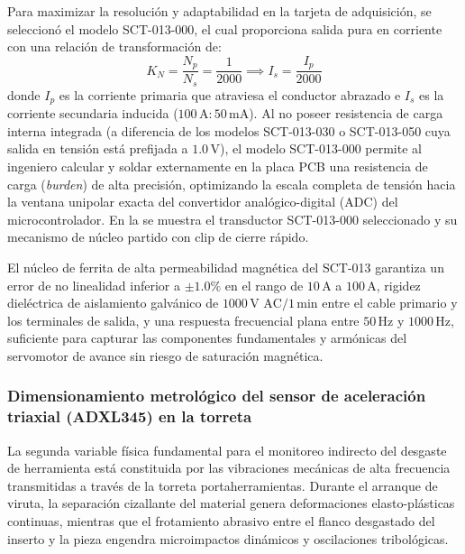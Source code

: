 Para maximizar la resolución y adaptabilidad en la tarjeta de adquisición, se seleccionó el modelo SCT-013-000, el cual proporciona salida pura en corriente con una relación de transformación de:
\begin{equation}
K_N = \frac{N_p}{N_s} = \frac{1}{2000} \implies I_s = \frac{I_p}{2000}
\label{eq:mp_relacion_transformacion}
\end{equation}
\noindent donde $I_p$ es la corriente primaria que atraviesa el conductor abrazado e $I_s$ es la corriente secundaria inducida ($100\,\text{A} : 50\,\text{mA}$). Al no poseer resistencia de carga interna integrada (a diferencia de los modelos SCT-013-030 o SCT-013-050 cuya salida en tensión está prefijada a $1.0\,\text{V}$), el modelo SCT-013-000 permite al ingeniero calcular y soldar externamente en la placa PCB una resistencia de carga (\textit{burden}) de alta precisión, optimizando la escala completa de tensión hacia la ventana unipolar exacta del convertidor analógico-digital (ADC) del microcontrolador. En la  se muestra el transductor SCT-013-000 seleccionado y su mecanismo de núcleo partido con clip de cierre rápido.


El núcleo de ferrita de alta permeabilidad magnética del SCT-013 garantiza un error de no linealidad inferior a $\pm 1.0\%$ en el rango de $10\,\text{A}$ a $100\,\text{A}$, rigidez dieléctrica de aislamiento galvánico de $1000\,\text{V AC} / 1\,\text{min}$ entre el cable primario y los terminales de salida, y una respuesta frecuencial plana entre $50\,\text{Hz}$ y $1000\,\text{Hz}$, suficiente para capturar las componentes fundamentales y armónicas del servomotor de avance sin riesgo de saturación magnética.

\subsubsection{Dimensionamiento metrológico del sensor de aceleración triaxial (ADXL345) en la torreta}
\label{subsubsec:dimensionamiento_acelerometro}

La segunda variable física fundamental para el monitoreo indirecto del desgaste de herramienta está constituida por las vibraciones mecánicas de alta frecuencia transmitidas a través de la torreta portaherramientas. Durante el arranque de viruta, la separación cizallante del material genera deformaciones elasto-plásticas continuas, mientras que el frotamiento abrasivo entre el flanco desgastado del inserto y la pieza engendra microimpactos dinámicos y oscilaciones tribológicas.

